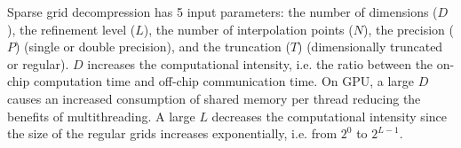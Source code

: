 Sparse grid decompression has 5 input parameters: the number of dimensions
($D$), the refinement level ($L$), the number of interpolation points ($N$), the
precision ($P$) (single or double precision), and the truncation ($T$)
(dimensionally truncated or regular). $D$ increases the computational intensity, 
i.e. the ratio between the on-chip
computation time and off-chip communication time. On GPU, a large $D$ causes an
increased consumption of shared memory per thread reducing the benefits of
multithreading. A large $L$ decreases the computational intensity since the size
of the regular grids increases exponentially, i.e. from $2^0$ to $2^{L-1}$. 


